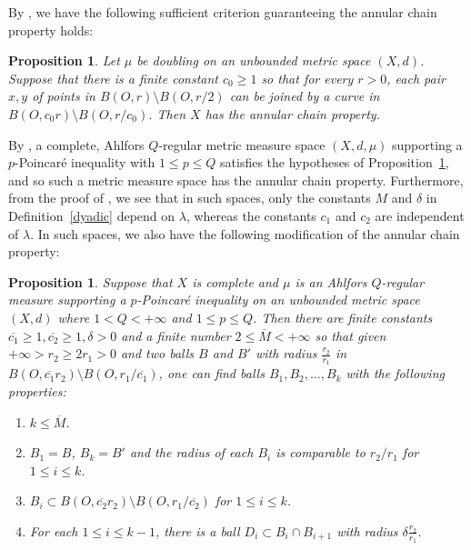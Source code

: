 \documentclass[10pt]{amsart}
\newtheorem{proposition}[theorem]{Proposition}
\numberwithin{equation}{section}
\begin{document}
By \cite[Lemma 2.3]{KN22}, we have the following sufficient criterion guaranteeing the annular chain property holds:
\begin{proposition} \label{prop2.3}
Let $\mu$ be doubling on an unbounded metric space $(X,d)$.
Suppose that there is a finite constant $c_0\geq 1$ so that for every $r>0$, each pair $x,y$ of points in $B(O,r)\setminus B(O,r/2)$ can be joined by a curve in $B(O,c_0r)\setminus B(O,r/c_0)$. Then $X$ has the annular chain property.
\end{proposition}

By \cite[Theorem~3.3]{K07}, a complete, Ahlfors $Q$-regular metric measure space $(X,d,\mu)$ supporting a $p$-Poincar\'e inequality with $1\le p\le Q$ satisfies the hypotheses of Proposition~\ref{prop2.3}, and so such a metric measure space has the annular chain property.  Furthermore, from the proof of \cite[Lemma~2.3]{KN22}, we see that in such spaces, only the constants $M$ and $\delta$ in Definition~\ref{dyadic} depend on $\lambda$, whereas the constants $c_1$ and $c_2$  are independent of $\lambda$. In such spaces, we also have the following modification of the annular chain property: 
\begin{proposition}\label{prop2.3-0806} Suppose that $X$ is complete and $\mu$ is an Ahlfors $Q$-regular measure supporting a $p$-Poincar\'e inequality on an unbounded metric space $(X,d)$ where $1<Q<+\infty$ and $1\le p\le Q$. Then
there are finite constants $\overline{c_1}\geq 1, \overline {c_2}\geq 1, \delta>0$ and a finite number $2\leq \overline M<{+\infty}$  so that given $+\infty>r_2\geq 2r_1>0$ and two balls $B$ and $B'$ with radius $\frac{r_2}{r_1}$ in $B(O,\overline{c_1} r_2)\setminus B(O,r_1/\overline{c_1})$, one can find balls $B_1, B_2, \ldots, B_k$ with the following properties:
	\begin{enumerate}
		\item[1.] $k\leq \overline M$.
		\item[2.] $B_1=B$, $B_k=B'$ and the radius of  each $B_i$ is comparable to $r_2/r_1$ for $1\leq i\leq k$. 
		\item[3.] $ B_i\subset B(O,\overline{c_2}r_2)\setminus B(O,r_1/\overline{c_2})$ for $1\leq i\leq k$.
		\item[4.] For each $1\leq i\leq k-1$, there is a ball $D_i\subset B_i\cap B_{i+1}$ with radius $\delta \frac{r_2}{r_1}$.
	\end{enumerate}
\end{proposition}
\end{document}
